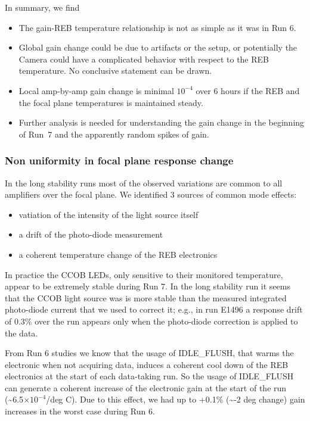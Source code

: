 In summary, we find
\begin{itemize}
    \item The gain-REB temperature relationship is not as simple as it was in Run 6.
    \item Global gain change could be due to  artifacts or the setup, or potentially the Camera could have a complicated behavior with respect to the REB temperature. No conclusive statement can be drawn.
    \item Local amp-by-amp gain change is minimal $10^{-4}$ over 6 hours if the REB and the focal plane temperatures is maintained steady.
    \item Further analysis is needed for understanding the gain change in the beginning of Run~7 and the apparently random spikes of gain.
\end{itemize}

\clearpage

\subsubsection{Non uniformity in focal plane response change}\label{sec:gain-stability-3}
In the long stability runs most of the observed variations are common to all amplifiers over the focal plane. We identified  3 sources of common mode effects: 
\begin{itemize} 
\item vatiation of the intensity of the light source itself 
\item a drift of the photo-diode measurement 
\item a coherent temperature change of the REB electronics 
\end{itemize}

In practice the CCOB LEDs, only sensitive to their monitored temperature, appear to be extremely stable during Run 7.  In the long stability run  it seems that the CCOB light source was is more stable than the measured integrated photo-diode current that we used to correct it; e.g., in run E1496 a response drift of 0.3\% over the run appears only when the photo-diode correction is applied to the data.

From Run 6 studies we know that the usage of IDLE\_FLUSH, that warms the electronic when not acquiring data, induces  a coherent cool down of the REB electronics at the start of each data-taking run. So  the usage of IDLE\_FLUSH can generate a coherent increase of the electronic gain at the start of the run (\textasciitilde6.5$\times 10^{-4}$/deg C).  Due to this effect, we had up to +0.1\% (\textasciitilde-2 deg change) gain increases in the worst case during  Run 6.  

